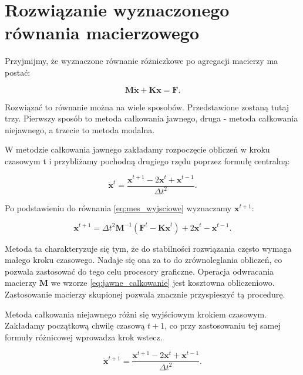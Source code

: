 
\section{Rozwiązanie wyznaczonego równania macierzowego}
\label{sec:rozwiazanie_r_roz}

Przyjmijmy, że wyznaczone równanie różniczkowe po agregacji macierzy ma postać:

\begin{equation} \label{eq:mes_wyjsciowe}
	\textbf{M} \ddot{\textbf{x}} + \textbf{Kx} = \textbf{F}.
\end{equation}

Rozwiązać to równanie można na wiele sposobów. Przedstawione zostaną tutaj trzy. Pierwszy sposób to metoda całkowania jawnego, druga - metoda całkowania niejawnego, a trzecie to metoda modalna.

W metodzie całkowania jawnego zakładamy rozpoczęcie obliczeń w kroku czasowym t i przybliżamy pochodną drugiego rzędu poprzez formułę centralną:

\begin{equation}
	\ddot{\textbf{x}}^t = \frac{\textbf{x}^{t+1} - 2\textbf{x}^t + \textbf{x}^{t-1}}{\Delta t^2}.
\end{equation}

Po podstawieniu do równania \ref{eq:mes_wyjsciowe} wyznaczamy \( \textbf{x}^{t+1} \):

\begin{equation} \label{eq:jawne_calkowanie}
	\textbf{x}^{t+1} = \Delta t^2 \textbf{M}^{-1}(\textbf{F}^t - \textbf{Kx}^t) + 2\textbf{x}^t - \textbf{x}^{t-1}.
\end{equation}

Metoda ta charakteryzuje się tym, że do stabilności rozwiązania często wymaga małego kroku czasowego. Nadaje się ona za to do zrównoleglania obliczeń, co pozwala zastosować do tego celu procesory graficzne. Operacja odwracania macierzy \( \textbf{M} \) we wzorze \ref{eq:jawne_calkowanie} jest kosztowna obliczeniowo. Zastosowanie macierzy skupionej pozwala znacznie przyspieszyć tą procedurę.

Metoda całkowania niejawnego różni się wyjściowym krokiem czasowym. Zakładamy początkową chwilę czasową \( t+1 \), co przy zastosowaniu tej samej formuły różnicowej wprowadza krok wstecz.

\begin{equation} \label{eq:niejawne}
	\ddot{\textbf{x}}^{t+1} = \frac{\textbf{x}^{t+1} - 2\textbf{x}^t + \textbf{x}^{t-1}}{\Delta t^2}.
\end{equation}

